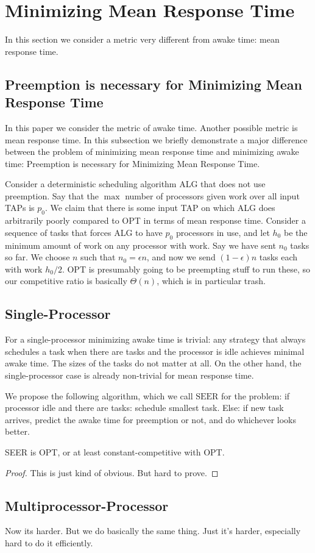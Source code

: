 \section{Minimizing Mean Response Time}
\label{sec:meanresponsetime}

In this section we consider a metric very different from awake
time: mean response time. 

\subsection{Preemption is necessary for Minimizing Mean Response Time}

In this paper we consider the metric of awake time. Another
possible metric is mean response time. In this subsection we
briefly demonstrate a major difference between the problem of
minimizing mean response time and minimizing awake time:
Preemption is necessary for Minimizing Mean Response Time.

Consider a deterministic scheduling algorithm ALG that does not
use preemption. Say that the $\max$ number of processors given
work over all input TAPs is $p_0$. We claim that there is some
input TAP on which ALG does arbitrarily poorly compared to OPT in
terms of mean response time.
Consider a sequence of tasks that forces ALG to have $p_0$
processors in use, and let $h_0$ be the minimum amount of work on
any processor with work. Say we have sent $n_0$ tasks so far.
We choose $n$ such that $n_0 = \epsilon n$, and now we send
$(1-\epsilon)n$ tasks each with work $h_0/2$. OPT is presumably
going to be preempting stuff to run these, so our competitive
ratio is basically $\Theta(n)$, which is in particular trash.


\subsection{Single-Processor}
For a single-processor minimizing awake time is trivial: any
strategy that always schedules a task when there are tasks and
the processor is idle achieves minimal awake time. The sizes of
the tasks do not matter at all.
On the other hand, the single-processor case is already
non-trivial for mean response time.

We propose the following algorithm, which we call
$\text{SEER}$ for
the problem: if processor idle and there are tasks: schedule
smallest task. Else: if new task arrives, predict the
awake time for preemption or not, and do whichever looks better.

\begin{clm}
  SEER is OPT, or at least constant-competitive with OPT.
\end{clm}
\begin{proof}
  This is just kind of obvious. But hard to prove.
\end{proof}

\subsection{Multiprocessor-Processor}
Now its harder. But we do basically the same thing. Just it's
harder, especially hard to do it efficiently.



